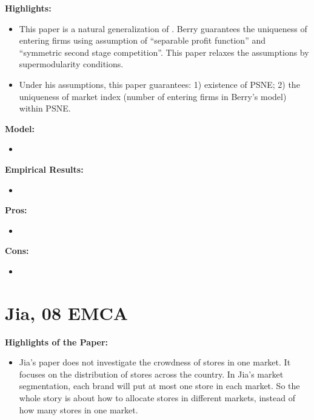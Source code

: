 \documentclass{book}
\theoremstyle{plain}
\theoremstyle{definition}
\begin{document}
\textbf{}

\vspace{1em}
\noindent
\textbf{Highlights:}
\begin{itemize}
	\item This paper is a natural generalization of \cite{Berry:1992gl}. Berry guarantees the uniqueness of entering firms using assumption of ``separable profit function'' and ``symmetric second stage competition''.
	This paper relaxes the assumptions by supermodularity conditions.

	\item Under his assumptions, this paper guarantees: 1) existence of PSNE; 2) the uniqueness of market index (number of entering firms in Berry's model) within PSNE.
\end{itemize}

\vspace{1em}
\noindent
\textbf{Model:}
\begin{itemize}
	\item 
\end{itemize}

\vspace{1em}
\noindent
\textbf{Empirical Results:}
\begin{itemize}
	\item 
\end{itemize}

\vspace{1em}
\noindent
\textbf{Pros:}
\begin{itemize}
	\item 
\end{itemize}

\vspace{1em}
\noindent
\textbf{Cons:}
\begin{itemize}
	\item 
\end{itemize}





\section{Jia, 08 EMCA} %
\label{sec:jia_08_emca}

\textbf{}

\vspace{1em}
\noindent
\textbf{Highlights of the Paper:}
\begin{itemize}
	\item Jia's paper does not investigate the crowdness of stores in one market. It focuses on the distribution of stores across the country. In Jia's market segmentation, each brand will put at most one store in each market. So the whole story is about how to allocate stores in different markets, instead of how many stores in one market.
\end{itemize}
\end{document}
